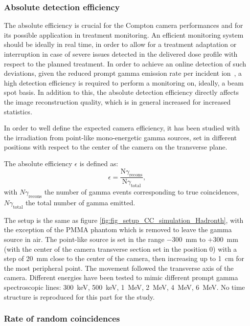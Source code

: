 \subsubsection{Absolute detection efficiency}
The absolute efficiency is crucial for the Compton camera performances and for its possible application in treatment monitoring. An efficient monitoring system should be ideally in real time, in order to allow for a treatment adaptation or interruption in case of severe issues detected in the delivered dose profile with respect to the planned treatment. In order to achieve an online detection of such deviations, given the reduced prompt gamma emission rate per incident ion~\cite{Ortega:2015aa}, a high detection efficiency is required to perform a monitoring on, ideally, a beam spot basis. In addition to this, the absolute detection efficiency directly affects the image reconstruction quality, which is in general increased for increased statistics.

In order to well define the expected camera efficiency, it has been studied with the irradiation from point-like mono-energetic gamma sources, set in different positions with respect to the center of the camera on the transverse plane.	

The absolute efficiency $\epsilon$ is defined as:
\begin{equation}
\epsilon =\frac{\mathrm{N}\gamma_{\mathrm{recons}}}{\mathrm{N}\gamma_{\mathrm{total}}},
\end{equation}
\label{eq:equation_efficacite_absolue}
with $N\gamma_{\mathrm{recons}}$ the number of gamma events corresponding to true coincidences, $N\gamma_{\mathrm{total}}$ the total number of gamma emitted.

The setup is the same as figure \ref{fig:fig_setup_CC_simulation_Hadronth}, with the exception of the PMMA phantom which is removed to leave the gamma source in air.
The point-like source is set in the range $-300$~mm to $+300$~mm (with the center of the camera transverse section set in the position 0) with a step of 20~mm close to the center of the camera, then increasing up to 1~cm for the most peripheral point. The movement followed the transverse axis of the camera. Different energies have been tested to mimic different prompt gamma spectroscopic lines: 300~keV, 500~keV, 1~MeV, 2~MeV, 4~MeV, 6~MeV. No time structure is reproduced for this part for the study.

\subsubsection{Rate of random coincidences}

